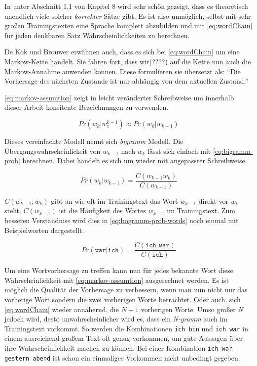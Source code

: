     In \parencite{nltk:book} unter Abschnitt 1.1 von Kapitel 8 wird sehr schön gezeigt, dass es theoretisch unendlich viele solcher \emph{korrekter} Sätze gibt. Es ist also unmöglich, selbst mit sehr großen Trainingstexten eine Sprache komplett abzubilden und mit \autoref{eq:wordChain} für jeden denkbaren Satz Wahrscheinlichkeiten zu berechnen.
        
    De Kok und Brouwer erwähnen auch, dass es sich bei \autoref{eq:wordChain} um eine Markow-Kette handelt. Sie fahren fort, dass wir(????) auf die Kette nun auch die Markow-Annahme anwenden können. Diese formulieren sie übersetzt als: \enquote{Die Vorhersage des nächsten Zustands ist nur abhängig von dem aktuellen Zustand.}\parencite[Abs.  3.8]{nlwp:book}
        
    \autoref{eq:markov-assumtion} zeigt \parencite[Abs.  3.8, Gleichung 3.8]{nlwp:book} in leicht veränderter Schreibweise um innerhalb dieser Arbeit konsitente Bezeichnungen zu verwenden.
        
    \begin{equation}
       	Pr(w_k|w_1^{k-1}) \approx Pr(w_k|w_{k-1})
       	\label{eq:markov-assumtion}
    \end{equation}
        
    Dieses vereinfachte Modell nennt sich \emph{bigramm} Modell. Die Übergangswahrscheinlickeit von \(w_{k-1}\) nach \(w_k\) lässt sich einfach mit \autoref{eq:bigramm-prob} berechnen. Dabei handelt es sich um \parencite[Abs.  3.8, Gleichung 3.9]{nlwp:book} wieder mit angepasster Schreibweise.
        
    \begin{equation}
       	Pr(w_k|w_{k-1}) = \frac{C(w_{k-1} w_k)}{C(w_{k-1})}
       	\label{eq:bigramm-prob}
    \end{equation}
    	
    \(C(w_{k-1};w_k)\) gibt an wie oft im Trainingstext das Wort \(w_{k-1}\) direkt vor \(w_k\) steht. \(C(w_{k-1})\) ist die Häufigkeit des Wortes \(w_{k-1}\) im Trainingstext. Zum besseren Verständniss wird dies in \autoref{eq:bogramm-prob-words} noch einmal mit Beispielworten dargestellt.
        
    \begin{equation}
       	Pr(\texttt{war}|\texttt{ich}) = \frac{C(\texttt{ich war})}{C(\texttt{ich})}
       	\label{eq:bogramm-prob-words}
    \end{equation}
        
        
    Um eine Wortvorhersage zu treffen kann nun für jedes bekannte Wort diese Wahrscheinlichkeit mit \autoref{eq:markov-assumtion} ausgerechnet werden. Es ist möglich die Qualität der Vorhersage zu verbessern, wenn man nun nicht nur das vorherige Wort sondern die zwei vorherigen Worte betrachtet. Oder auch, sich \autoref{eq:wordChain} wieder annähernd, die \(N - 1\) vorherigen Worte. Umso größer \emph{N} jedoch wird, desto unwahrscheinlicher wird es, dass ein \emph{N-gramm} auch im Trainingstext vorkommt. So werden die Kombinationen \texttt{ich bin} und \texttt{ich war} in einem ausreichend großem Text oft genug vorkommen, um gute Aussagen über ihre Wahrscheinlichkeit machen zu können. Bei einer Kombination \texttt{ich war gestern abend} ist schon ein einmaliges Vorkommen nicht unbedingt gegeben.
    
